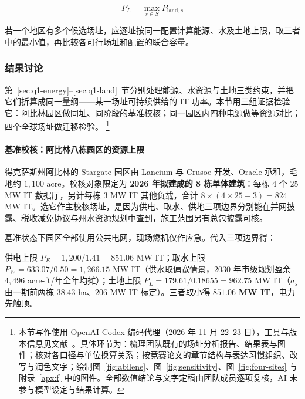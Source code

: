 \begin{equation}\label{eq:q1-pl}
P_L=\max_{s\in S}P_{\mathrm{land},s}
\end{equation}

\begin{noteblock}
若一个地区有多个候选场址，应逐址按同一配置计算能源、水及土地上限，取三者中的最小值，再比较各可行场址和配置的联合容量。
\end{noteblock}

\subsubsection{结果讨论}\label{sec:q1-results}

第~\ref{sec:q1-energy}--\ref{sec:q1-land}~节分别处理能源、水资源与土地三类约束，并把它们折算成同一量纲——某一场址可持续供给的 IT 功率。本节用三组证据检验它：阿比林园区做同址、同阶段的基准校核；同一园区内四种电源做等资源对比；四个全球场址做迁移检验。%
\footnote{本节写作使用 OpenAI Codex 编码代理（2026 年 11 月 22–23 日），工具与版本信息见文献~\cite{apxref29}。具体环节为：梳理团队既有的场址分析报告、结果表与图件；核对各口径与单位换算关系；按竞赛论文的章节结构与表达习惯组织、改写与润色文字；绘制图~\ref{fig:abilene}、图~\ref{fig:sensitivity}、图~\ref{fig:four-sites} 与附录~\ref{apx:f} 中的图件。全部数值结论与文字定稿由团队成员逐项复核，AI 未参与模型设定与结果计算。}

\paragraph{基准校核：阿比林八栋园区的资源上限}\label{sec:abilene}

得克萨斯州阿比林的 Stargate 园区由 Lancium 与 Crusoe 开发、Oracle 承租，毛地约 $1{,}100$ acre。校核对象限定为 \textbf{2026 年拟建成的 8 栋单体建筑}：每栋 4 个 $25$ MW IT 数据厅，另计每栋 $3$ MW IT 其他负载，合计 $8\times(4\times25+3)=824$ MW IT。选它作主校核场址，是因为供电、取水、供地三项边界分别能在并网披露、税收减免协议与州水资源规划中查到，施工范围另有总包披露可核。\cite{apxref01,apxref02,apxref03,apxref04,apxref09,apxref11,apxref12,apxref13}

基准状态下园区全部使用公共电网，现场燃机仅作应急。代入三项边界得：

供电上限 $P_E=1{,}200/1.41=851.06$ MW IT；取水上限 $P_W=633.07/0.50=1{,}266.15$ MW IT（供水取偏宽情景，2030 年市级规划盈余 $4{,}496$ acre-ft/年全年均摊）；土地上限 $P_L=179.61/0.18655=962.75$ MW IT（$a_s$ 由一期前两栋 $38.43$ ha、$206$ MW IT 标定）。三者取小得 $851.06$ \textbf{MW IT}，电力先触顶。

